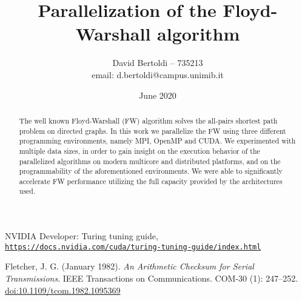 \documentclass[compsoc]{IEEEtran}
\title{Parallelization of the Floyd-Warshall algorithm}
\author{David Bertoldi -- 735213 \\ email: d.bertoldi@campus.unimib.it}
\affil{Department of Informatics, Systems and Communication}
\affil{University of Milano-Bicocca}
\date{June 2020}
\begin{document}
\maketitle 



\begin{abstract}
The well known Floyd-Warshall (FW) algorithm solves the all-pairs shortest path problem on directed graphs. In this work we parallelize the FW using three different
programming environments, namely MPI, OpenMP and CUDA. We experimented with multiple data sizes, in order to gain insight on the execution behavior
of the parallelized algorithms on modern multicore and distributed platforms, and on the programmability of the aforementioned environments. We were able
to significantly accelerate FW performance utilizing the full capacity provided by the architectures used.
\end{abstract}



















\begin{thebibliography}{9}

NVIDIA Developer: Turing tuning guide,
\\\texttt{\href{https://docs.nvidia.com/cuda/turing-tuning-guide/index.html}{https://docs.nvidia.com/cuda/turing-tuning-guide/index.html}}


Fletcher, J. G. (January 1982). \textit{An Arithmetic Checksum for Serial Transmissions}. IEEE Transactions on Communications. COM-30 (1): 247–252. 
\href{https://ieeexplore.ieee.org/document/1095369}{doi:10.1109/tcom.1982.1095369}
\end{thebibliography}
\end{document}
